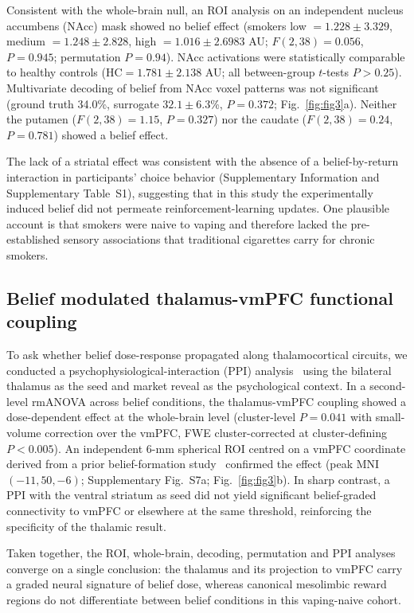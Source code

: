 \documentclass[11pt]{article}
\begin{document}
Consistent with the whole-brain null, an ROI analysis on an independent nucleus accumbens (NAcc) mask showed no belief effect (smokers low $=1.228 \pm 3.329$, medium $=1.248 \pm 2.828$, high $=1.016 \pm 2.6983$ AU; $F(2,38)=0.056$, $P=0.945$; permutation $P=0.94$). NAcc activations were statistically comparable to healthy controls ($\mathrm{HC}=1.781 \pm 2.138$ AU; all between-group $t$-tests $P>0.25$). Multivariate decoding of belief from NAcc voxel patterns was not significant (ground truth 34.0\%, surrogate $32.1 \pm 6.3$\%, $P=0.372$; Fig.~\ref{fig:fig3}a). Neither the putamen ($F(2,38)=1.15$, $P=0.327$) nor the caudate ($F(2,38)=0.24$, $P=0.781$) showed a belief effect.

The lack of a striatal effect was consistent with the absence of a belief-by-return interaction in participants' choice behavior (Supplementary Information and Supplementary Table~S1), suggesting that in this study the experimentally induced belief did not permeate reinforcement-learning updates. One plausible account is that smokers were naive to vaping and therefore lacked the pre-established sensory associations that traditional cigarettes carry for chronic smokers.

\subsection{Belief modulated thalamus-vmPFC functional coupling}

To ask whether belief dose-response propagated along thalamocortical circuits, we conducted a psychophysiological-interaction (PPI) analysis~\cite{friston1997psychophysiological} using the bilateral thalamus as the seed and market reveal as the psychological context. In a second-level rmANOVA across belief conditions, the thalamus-vmPFC coupling showed a dose-dependent effect at the whole-brain level (cluster-level $P=0.041$ with small-volume correction over the vmPFC, FWE cluster-corrected at cluster-defining $P<0.005$). An independent 6-mm spherical ROI centred on a vmPFC coordinate derived from a prior belief-formation study~\cite{rouault2018belief} confirmed the effect (peak MNI $(-11, 50, -6)$; Supplementary Fig.~S7a; Fig.~\ref{fig:fig3}b). In sharp contrast, a PPI with the ventral striatum as seed did not yield significant belief-graded connectivity to vmPFC or elsewhere at the same threshold, reinforcing the specificity of the thalamic result.

Taken together, the ROI, whole-brain, decoding, permutation and PPI analyses converge on a single conclusion: the thalamus and its projection to vmPFC carry a graded neural signature of belief dose, whereas canonical mesolimbic reward regions do not differentiate between belief conditions in this vaping-naive cohort.
\end{document}
